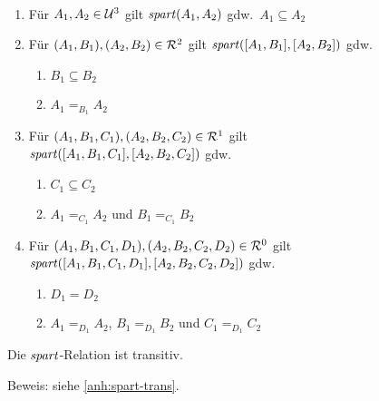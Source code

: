 % 
%     
    \begin{satz}\ \vspace{0pt}

        \begin{enumerate}
            \item Für $A_1, A_2 \in \mathcal{U}^3$ gilt $\mathit{spart}(A_1,A_2)$ gdw.\ $A_1 \subseteq A_2$
            \item Für $(A_1,B_1), (A_2,B_2) \in \mathcal{R}^2$ gilt $\mathit{spart}([A_1,B_1],[A_2,B_2])$ gdw. 
                \begin{enumerate}
                    \item $B_1 \subseteq B_2$
                    \item $A_1 =_{B_1} A_2$
                \end{enumerate}	
            \item Für $(A_1,B_1,C_1), (A_2,B_2,C_2) \in \mathcal{R}^1$ gilt\\
                $\mathit{spart}([A_1,B_1,C_1],[A_2,B_2,C_2])$ gdw. 
                \begin{enumerate}
                    \item $C_1 \subseteq C_2$
                    \item $A_1 =_{C_1} A_2$ und $B_1 =_{C_1} B_2$
                \end{enumerate}	
            \item Für $(A_1,B_1,C_1,D_1), (A_2,B_2,C_2,D_2) \in \mathcal{R}^0$ gilt\\
                $\mathit{spart}([A_1,B_1,C_1,D_1],[A_2,B_2,C_2,D_2])$ gdw.
                \begin{enumerate}
                    \item $D_1 = D_2$
                    \item $A_1 =_{D_1} A_2$, $B_1 =_{D_1} B_2$ und $C_1 =_{D_1} C_2$
                \end{enumerate}	
        \end{enumerate}
        
    \end{satz}
    
    \begin{satz}\label{satz:spart-trans}
        Die $\mathit{spart}$-Relation ist transitiv.
    \end{satz}
    
    Beweis: siehe \ref{anh:spart-trans}.
    
    
